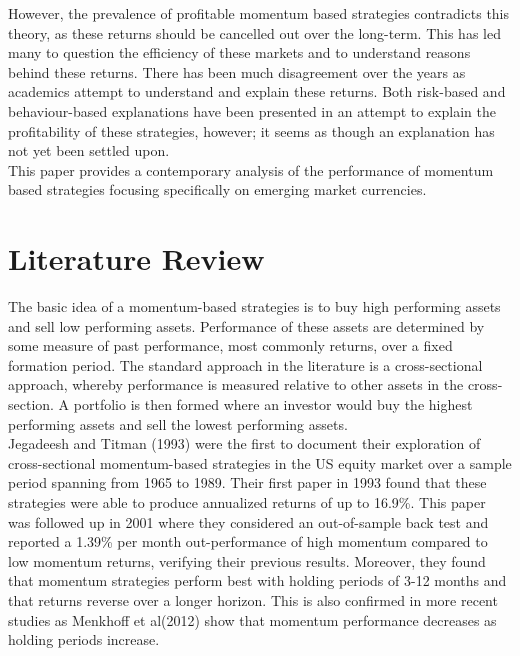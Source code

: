 \documentclass{article}
\begin{document}
 However, the prevalence of profitable momentum based strategies contradicts this theory, as these returns should be cancelled out over the long-term. This has led many to question the efficiency of these markets and to understand reasons behind these returns. There has been much disagreement over the years as academics attempt to understand and explain these returns. Both risk-based and behaviour-based explanations have been presented in an attempt to explain the profitability of these strategies, however; it seems as though an explanation has not yet been settled upon.\\

This paper provides a contemporary analysis of the performance of momentum based strategies focusing specifically on emerging market currencies. \\

\newpage
\section{Literature Review}

The basic idea of a momentum-based strategies is to buy high performing assets and sell low performing assets. Performance of these assets are determined by some measure of past performance, most commonly returns, over a fixed formation period. The standard approach in the literature is a cross-sectional approach, whereby performance is measured relative to other assets in the cross-section. A portfolio is then formed where an investor would buy the highest performing assets and sell the lowest performing assets.\\

Jegadeesh and Titman (1993) were the first to document their exploration of cross-sectional momentum-based strategies in the US equity market over a sample period spanning from 1965 to 1989. Their first paper in 1993 found that these strategies were able to produce annualized returns of up to 16.9\%. This paper was followed up in 2001 where they considered an out-of-sample back test and reported a 1.39\% per month out-performance of high momentum compared to low momentum returns, verifying their previous results. Moreover, they found that momentum strategies perform best with holding periods of 3-12 months and that returns reverse over a longer horizon. This is also confirmed in more recent studies as Menkhoff et al(2012) show that momentum performance decreases as holding periods increase.\\
\end{document}
